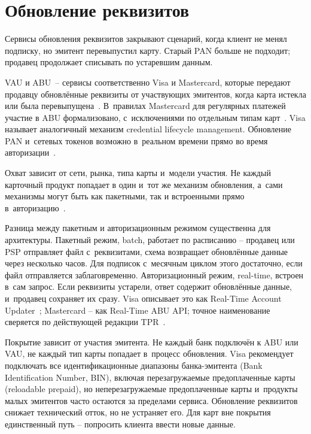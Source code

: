 \section{Обновление реквизитов}\label{sec:subscriptions-account-updater}

Сервисы обновления реквизитов закрывают сценарий, когда клиент не
менял подписку, но эмитент перевыпустил карту. Старый PAN больше
не подходит; продавец продолжает списывать по устаревшим данным.

VAU и ABU~-- сервисы соответственно Visa и Mastercard, которые передают продавцу обновлённые реквизиты от участвующих
эмитентов, когда карта истекла или была
перевыпущена~\cite{mc-abu-privacy,visa-vau}. В~правилах Mastercard для
регулярных платежей участие в ABU формализовано, с~исключениями
по отдельным типам карт~\cite{mc-tpr}. Visa называет аналогичный
механизм credential lifecycle management. Обновление PAN и~сетевых
токенов возможно в~реальном времени прямо во время
авторизации~\cite{visa-lifecycle-management}.

Охват зависит от сети, рынка,
типа карты и~модели участия. Не каждый карточный продукт попадает в
один и~тот же механизм обновления, а~сами механизмы могут быть как
пакетными, так и встроенными прямо в~авторизацию~\cite{mc-tpr,visa-lifecycle-management}.

Разница между пакетным и авторизационным режимом существенна
для архитектуры. Пакетный режим, batch, работает по расписанию --
продавец или PSP отправляет файл с~реквизитами, схема возвращает
обновлённые данные через несколько часов. Для подписок с~месячным
циклом этого достаточно, если файл отправляется заблаговременно.
Авторизационный режим, real-time, встроен в~сам запрос. Если
реквизиты устарели, ответ содержит обновлённые данные, и~продавец
сохраняет их сразу. Visa описывает это как Real-Time Account
Updater~\cite{visa-lifecycle-management}; Mastercard --
как Real-Time ABU API; точное наименование сверяется
по действующей редакции TPR~\cite{mc-tpr}.

Покрытие зависит от участия эмитента. Не каждый банк подключён
к ABU или VAU, не каждый тип карты попадает в~процесс обновления.
Visa рекомендует подключать все идентификационные диапазоны банка-эмитента (Bank Identification Number, BIN), включая перезагружаемые предоплаченные карты (reloadable prepaid),
но неперезагружаемые предоплаченные карты и~продукты малых эмитентов часто
остаются за пределами сервиса. Обновление реквизитов снижает
технический отток, но не устраняет его. Для карт вне покрытия
единственный путь -- попросить клиента ввести новые данные.

